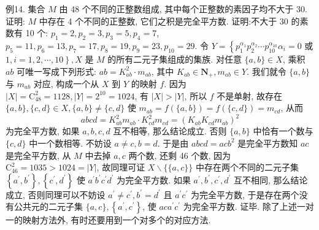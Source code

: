例14. 集合 $M$ 由 48 个不同的正整数组成, 其中每个正整数的素因子均不大于 30. 证明: $M$ 中存在 4 个不同的正整数, 它们之积是完全平方数.
证明:不大于 30 的素数有 10 个: $p_1=2, p_2=3, p_3=5, p_4=7$, $p_5=11, p_6=13, p_7=17, p_8=19, p_9=23, p_{10}=29$. 令 $Y=\left\{p_1^{\alpha_1} p_2^{\alpha_2} \cdots p_{10}^{\alpha_{10}}\right. \alpha_i=0$ 或 $\left.1, i=1,2, \cdots, 10\right\}, X$ 是 $M$ 的所有二元子集组成的集族.
对任意 $\{a, b\} \in X$, 乘积 $a b$ 可唯一写成下列形式: $a b=K_{a b}^2 \cdot m_{a b}$, 其中 $K_{a b} \in \mathbf{N}_{+}, m_{a b} \in Y$. 我们就令 $\{a, b\}$ 与 $m_{a b}$ 对应, 构成一个从 $X$ 到 $Y$ 的映射 $f$. 因为 $|X|=\mathrm{C}_{48}^2=1128,|Y|=2^{10}=1024$, 有 $|X|>|Y|$, 所以 $f$ 不是单射, 故存在 $\{a, b\},\{c, d\} \in X,\{a, b\} \neq\{c, d\}$ 使 $m_{a b}=f(\{a, b\})= f(\{c, d\})=m_{c d}$, 从而
$$
a b c d=K_{a b}^2 m_{a b} \cdot K_{c d}^2 m_{c d}=\left(K_{a b} K_{c d} m_{a b}\right)^2
$$
为完全平方数, 如果 $a, b, c, d$ 互不相等, 那么结论成立.
否则 $\{a, b\}$ 中恰有一个数与 $\{c, d\}$ 中一个数相等.
不妨设 $a \neq c, b=d$. 于是由 $a b c d=a c b^2$ 是完全平方数知 $a c$ 是完全平方数, 从 $M$ 中去掉 $a, c$ 两个数, 还剩 46 个数, 因为 $\mathrm{C}_{46}^2=1035>1024=|Y|$, 故同理可证 $X \backslash\{\{a, c\}\}$ 中存在两个不同的二元子集 $\left\{a^{\prime}, b^{\prime}\right\},\left\{c^{\prime}, d^{\prime}\right\}$ 使 $a^{\prime} b^{\prime} c^{\prime} d^{\prime}$ 为完全平方数.
如果 $a^{\prime}, b^{\prime}, c^{\prime}, d^{\prime}$ 互不相同, 那么结论成立, 否则同理可以不妨设 $a^{\prime} \neq c^{\prime}, b^{\prime}=d^{\prime}$ 且 $a^{\prime} c^{\prime}$ 为完全平方数, 于是存在两个没有公共元的二元子集 $\{a, c\},\left\{a^{\prime}, c^{\prime}\right\}$, 使 $a c a^{\prime} c^{\prime}$ 为完全平方数.
证毕.
除了上述一对一的映射方法外, 有时还要用到一个对多个的对应方法.



